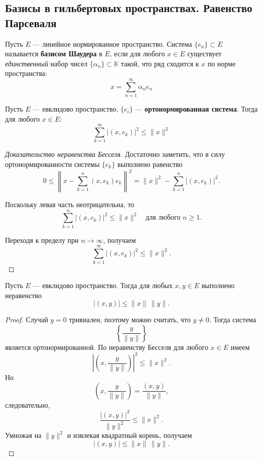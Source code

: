 
\subsection{Базисы в гильбертовых пространствах. Равенство Парсеваля}

\begin{definition}
	Пусть $E$ --- линейное нормированное пространство. Система $\{e_n\} \subset E$ называется \textbf{базисом Шаудера} в $E$, если для любого $x \in E$ существует \textit{единственный} набор чисел $\{\alpha_n\} \subset \mathbb{K}$ такой, что ряд сходится к $x$ по норме пространства:
	\[ x = \sum_{n = 1}^{\infty} \alpha_n e_n \]
\end{definition}

\begin{proposition}
	Пусть $E$ --- евклидово пространство, $\{e_i\}$ --- \textbf{ортонормированная система}. Тогда для любого $x \in E$:
	\[\sum_{k = 1}^{\infty}|(x, e_k)|^2 \leqslant \|x\|^2\]
\end{proposition}
\begin{proof}[Доказательство неравенства Бесселя]
	Достаточно заметить, что в силу ортонормированности системы $\{e_k\}$ выполнено равенство
	$$
	0 \le \left\|x-\sum_{k=1}^{n}(x,e_k)e_k\right\|^2
	= \|x\|^2-\sum_{k=1}^{n}|(x,e_k)|^2.
	$$
	
	Поскольку левая часть неотрицательна, то
	$$
	\sum_{k=1}^{n}|(x,e_k)|^2 \le \|x\|^2
	\quad \text{для любого } n\ge1.
	$$
	
	Переходя к пределу при $n\to\infty$, получаем
	$$
	\sum_{k=1}^{\infty}|(x,e_k)|^2 \le \|x\|^2.
	$$
\end{proof}

\begin{theorem}
	Пусть $E$ --- евклидово пространство. Тогда для любых $x,y\in E$ выполнено неравенство
	$$
	|(x,y)|\le \|x\|\,\|y\|.
	$$
\end{theorem}

\begin{proof}
	Случай $y=0$ тривиален, поэтому можно считать, что $y\ne 0$. Тогда система
	$$
	\left\{\frac{y}{\|y\|}\right\}
	$$
	является ортонормированной. По неравенству Бесселя для любого $x\in E$ имеем
	$$
	\left|\left(x,\frac{y}{\|y\|}\right)\right|^2 \le \|x\|^2.
	$$
	Но
	$$
	\left(x,\frac{y}{\|y\|}\right)=\frac{(x,y)}{\|y\|},
	$$
	следовательно,
	$$
	\frac{|(x,y)|^2}{\|y\|^2}\le \|x\|^2.
	$$
	Умножая на $\|y\|^2$ и извлекая квадратный корень, получаем
	$$
	|(x,y)|\le \|x\|\,\|y\|.
	$$
\end{proof}

